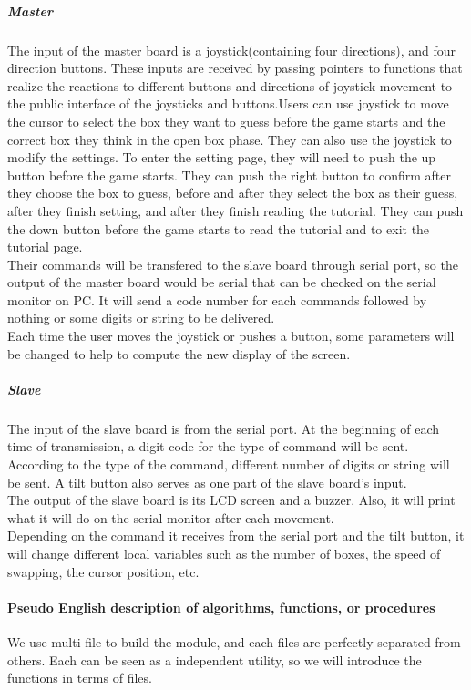 \subparagraph{Master}
\hfill \newline
The input of the master board is a joystick(containing four directions), and four direction buttons. These inputs are received by passing pointers to functions that realize the reactions to different buttons and directions of joystick movement to the public interface of the joysticks and buttons.Users can use joystick to move the cursor to select the box they want to guess before the game starts and the correct box they think in the open box phase. They can also use the joystick to modify the settings. To enter the setting page, they will need to push the up button before the game starts. They can push the right button to confirm after they choose the box to guess, before and after they select the box as their guess, after they finish setting, and after they finish reading the tutorial. They can push the down button before the game starts to read the tutorial and to exit the tutorial page. \\
\hfill \newline
Their commands will be transfered to the slave board through serial port, so the output of the master board would be serial that can be checked on the serial monitor on PC. It will send a code number for each commands followed by nothing or some digits or string to be delivered. \\
\hfill \newline
Each time the user moves the joystick or pushes a button, some parameters will be changed to help to compute the new display of the screen.
\subparagraph{Slave}
\hfill \newline
The input of the slave board is from the serial port. At the beginning of each time of transmission, a digit code for the type of command will be sent. According to the type of the command, different number of digits or string will be sent. A tilt button also serves as one part of the slave board's input.\\
\hfill \newline
The output of the slave board is its LCD screen and a buzzer. Also, it will print what it will do on the serial monitor after each movement.\\
\hfill \newline
Depending on the command it receives from the serial port and the tilt button, it will change different local variables such as the number of boxes, the speed of swapping, the cursor position, etc.

\paragraph{Pseudo English description of algorithms, functions, or procedures}
\hfill \newline
We use multi-file to build the module, and each files are perfectly separated from others. Each can be seen as a independent utility, so we will introduce the functions in terms of files.

